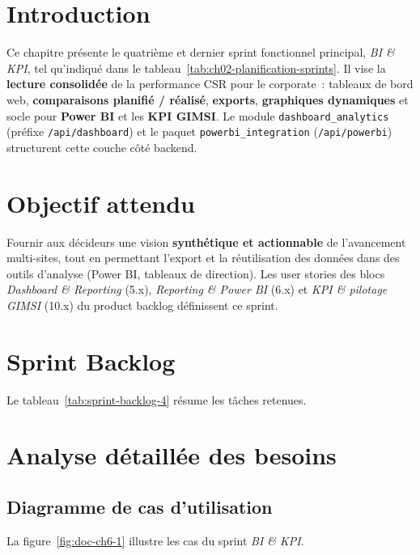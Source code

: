 
\section{Introduction}

Ce chapitre présente le quatrième et dernier sprint fonctionnel principal, \emph{BI \& KPI}, tel qu'indiqué dans le tableau~\ref{tab:ch02-planification-sprints}. Il vise la \textbf{lecture consolidée} de la performance CSR pour le corporate~: tableaux de bord web, \textbf{comparaisons planifié / réalisé}, \textbf{exports}, \textbf{graphiques dynamiques} et socle pour \textbf{Power BI} et les \textbf{KPI GIMSI}. Le module \texttt{dashboard\_analytics} (préfixe \texttt{/api/dashboard}) et le paquet \texttt{powerbi\_integration} (\texttt{/api/powerbi}) structurent cette couche côté backend.

\section{Objectif attendu}

Fournir aux décideurs une vision \textbf{synthétique et actionnable} de l'avancement multi-sites, tout en permettant l'export et la réutilisation des données dans des outils d'analyse (Power BI, tableaux de direction). Les user stories des blocs \emph{Dashboard \& Reporting} (5.x), \emph{Reporting \& Power BI} (6.x) et \emph{KPI \& pilotage GIMSI} (10.x) du product backlog définissent ce sprint.

\section{Sprint Backlog}

Le tableau~\ref{tab:sprint-backlog-4} résume les tâches retenues.



\section{Analyse détaillée des besoins}

\subsection{Diagramme de cas d'utilisation}

La figure~\ref{fig:doc-ch6-1} illustre les cas du sprint \emph{BI \& KPI}.


